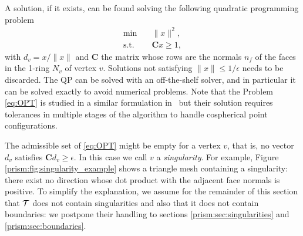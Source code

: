 A solution, if it exists, can be found solving the following quadratic programming problem
\begin{equation}
\label{eq:QP}
\begin{split}
    \min&\quad \|x\|^2,  \\
    \text{s.t.}&\quad \mathbf{C} x \geq 1,
\end{split}
\end{equation}
with $d_v = x / \|x\|$ and $\mathbf{C}$ the matrix whose rows are the normals $n_f$ of the faces in the 1-ring $N_v$ of vertex $v$. Solutions not satisfying $\|x\| \leq 1/\epsilon$ needs to be discarded. The QP can be solved with an off-the-shelf solver\cite{osqp,cheshmi2020nasoq}, and in particular it can be solved exactly \cite{gartner2000efficient} to avoid numerical problems. Note that the Problem \eqref{eq:OPT} is studied in a similar formulation in~\cite{aubry2008most} but their solution requires tolerances in multiple stages of the algorithm to handle cospherical point configurations.




The admissible set of \eqref{eq:OPT} might be empty for a vertex $v$,
that is, no vector $d_v$ satisfies $\mathbf{C}d_v\geq\epsilon$. 
In this case we call $v$ a \emph{singularity}. For example, Figure \ref{prism:fig:singularity_example} shows a triangle mesh containing a singularity: there exist no direction whose dot product with the adjacent face normals is positive. To simplify the explanation, we assume for the remainder of this section that $\mathcal{T}$ does not contain singularities and also that it does not contain boundaries: we postpone their handling to sections \ref{prism:sec:singularities} and \ref{prism:sec:boundaries}.

